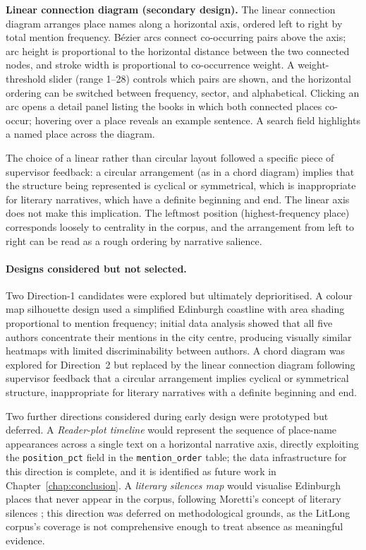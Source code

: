 \documentclass[logo,msc]{infthesis}
\begin{document}
\textbf{Linear connection diagram (secondary design).} The linear connection diagram arranges place names along a horizontal axis, ordered left to right by total mention frequency. Bézier arcs connect co-occurring pairs above the axis; arc height is proportional to the horizontal distance between the two connected nodes, and stroke width is proportional to co-occurrence weight. A weight-threshold slider (range 1--28) controls which pairs are shown, and the horizontal ordering can be switched between frequency, sector, and alphabetical. Clicking an arc opens a detail panel listing the books in which both connected places co-occur; hovering over a place reveals an example sentence. A search field highlights a named place across the diagram.
 
The choice of a linear rather than circular layout followed a specific piece of supervisor feedback: a circular arrangement (as in a chord diagram) implies that the structure being represented is cyclical or symmetrical, which is inappropriate for literary narratives, which have a definite beginning and end. The linear axis does not make this implication. The leftmost position (highest-frequency place) corresponds loosely to centrality in the corpus, and the arrangement from left to right can be read as a rough ordering by narrative salience.

\paragraph{Designs considered but not selected.} Two Direction-1 candidates were explored but ultimately deprioritised. A colour map silhouette design used a simplified Edinburgh coastline with area shading proportional to mention frequency; initial data analysis showed that all five authors concentrate their mentions in the city centre, producing visually similar heatmaps with limited discriminability between authors. A chord diagram was explored for Direction~2 but replaced by the linear connection diagram following supervisor feedback that a circular arrangement implies cyclical or symmetrical structure, inappropriate for literary narratives with a definite beginning and end.

Two further directions considered during early design were prototyped but deferred. A \emph{Reader-plot timeline} would represent the sequence of place-name appearances across a single text on a horizontal narrative axis, directly exploiting the \texttt{position\_pct} field in the \texttt{mention\_order} table; the data infrastructure for this direction is complete, and it is identified as future work in Chapter~\ref{chap:conclusion}. A \emph{literary silences map} would visualise Edinburgh places that never appear in the corpus, following Moretti's concept of literary silences \cite{moretti2005}; this direction was deferred on methodological grounds, as the LitLong corpus's coverage is not comprehensive enough to treat absence as meaningful evidence.
 
\end{document}
